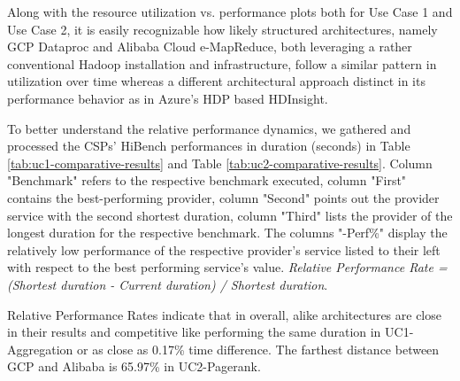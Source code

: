 \documentclass[review]{elsarticle}
\begin{document}
Along with the resource utilization vs. performance plots both for Use Case 1 and Use Case 2, it is easily recognizable how likely structured architectures, namely GCP Dataproc and Alibaba Cloud e-MapReduce, both leveraging a rather conventional Hadoop installation and infrastructure, follow a similar pattern in utilization over time whereas a different architectural approach distinct in its performance behavior as in Azure's HDP based HDInsight. 

To better understand the relative performance dynamics, we gathered and processed the CSPs' HiBench performances in duration (seconds) in Table \ref{tab:uc1-comparative-results} and Table \ref{tab:uc2-comparative-results}. Column "Benchmark" refers to the respective benchmark executed, column "First" contains the best-performing provider, column "Second" points out the provider service with the second shortest duration, column "Third" lists the provider of the longest duration for the respective benchmark. The columns "-Perf\%" display the relatively low performance of the respective provider's service listed to their left with respect to the best performing service's value. \textit{Relative Performance Rate = (Shortest duration - Current duration) / Shortest duration}. 

Relative Performance Rates indicate that in overall, alike architectures are close in their results and competitive like performing the same duration in UC1-Aggregation or as close as 0.17\% time difference. The farthest distance between GCP and Alibaba is 65.97\% in UC2-Pagerank.
\end{document}

